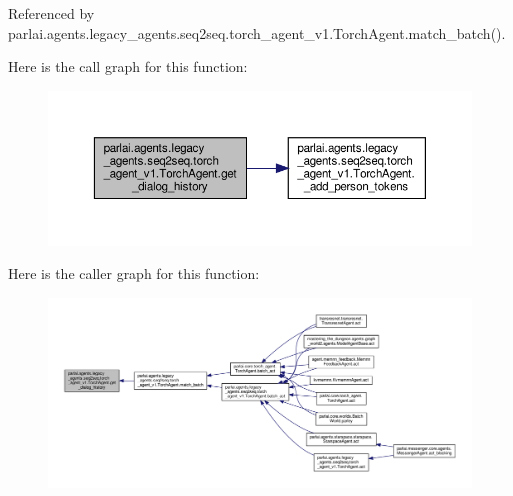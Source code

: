 Referenced by parlai.\+agents.\+legacy\+\_\+agents.\+seq2seq.\+torch\+\_\+agent\+\_\+v1.\+Torch\+Agent.\+match\+\_\+batch().

Here is the call graph for this function\+:
\nopagebreak
\begin{figure}[H]
\begin{center}
\leavevmode
\includegraphics[width=350pt]{classparlai_1_1agents_1_1legacy__agents_1_1seq2seq_1_1torch__agent__v1_1_1TorchAgent_a8984452b8b4e6194625530aeae49b243_cgraph}
\end{center}
\end{figure}
Here is the caller graph for this function\+:
\nopagebreak
\begin{figure}[H]
\begin{center}
\leavevmode
\includegraphics[width=350pt]{classparlai_1_1agents_1_1legacy__agents_1_1seq2seq_1_1torch__agent__v1_1_1TorchAgent_a8984452b8b4e6194625530aeae49b243_icgraph}
\end{center}
\end{figure}
\mbox{\label{classparlai_1_1agents_1_1legacy__agents_1_1seq2seq_1_1torch__agent__v1_1_1TorchAgent_a1727b17db185dcc7237d893018c7b76c}} 
